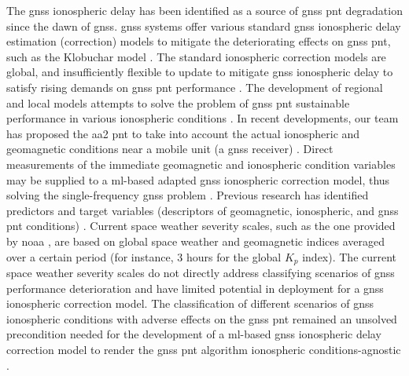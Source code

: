 \documentclass[sn-mathphys-num]{sn-jnl}%
\begin{document}
The \acrshort{gnss} ionospheric delay has been identified as a source of \acrshort{gnss} \acrshort{pnt} degradation since the dawn of \acrshort{gnss}. \acrshort{gnss} systems offer various standard \acrshort{gnss} ionospheric delay estimation (correction) models to mitigate the deteriorating effects on \acrshort{gnss} \acrshort{pnt}, such as the Klobuchar model \cite{spilker1996global, filic2018modelling}. The standard ionospheric correction models are global, and insufficiently flexible to update to mitigate \acrshort{gnss} ionospheric delay to satisfy rising demands on \acrshort{gnss} \acrshort{pnt} performance \cite{filjar2024ambient, filic2018modelling}. The development of regional and local models attempts to solve the problem of \acrshort{gnss} \acrshort{pnt} sustainable performance in various ionospheric conditions \cite{sikirica2021risk}. In recent developments, our team has proposed the \acrfull{aa2} \acrshort{pnt} to take into account the actual ionospheric and geomagnetic conditions near a mobile unit (a \acrshort{gnss} receiver) \cite{filjar2022application, filic2018modelling, filjar2024ambient}. Direct measurements of the immediate geomagnetic and ionospheric condition variables may be supplied to a \acrlong{ml}-based adapted \acrshort{gnss} ionospheric correction model, thus solving the single-frequency \acrshort{gnss} problem \cite{filjar2022application}. Previous research has identified predictors and target variables (descriptors of geomagnetic, ionospheric, and \acrshort{gnss} \acrshort{pnt} conditions) \cite{filic2018modelling, natras2022ensemble, natras2023regional}. Current space weather severity scales, such as the one provided by \acrfull{noaa} \cite{NOAA2024eSpace}, are based on global space weather and geomagnetic indices averaged over a certain period (for instance, $3$ hours for the global $K_{p}$ index). The current space weather severity scales do not directly address classifying scenarios of \acrshort{gnss} performance deterioration and have limited potential in deployment for a \acrshort{gnss} ionospheric correction model. The classification of different scenarios of \acrshort{gnss} ionospheric conditions with adverse effects on the \acrshort{gnss} \acrshort{pnt} remained an unsolved precondition needed for the development of a \acrlong{ml}-based \acrshort{gnss} ionospheric delay correction model to render the \acrshort{gnss} \acrshort{pnt} algorithm ionospheric conditions-agnostic \cite{filjar2022application, filjar2024ambient}.
\end{document}
